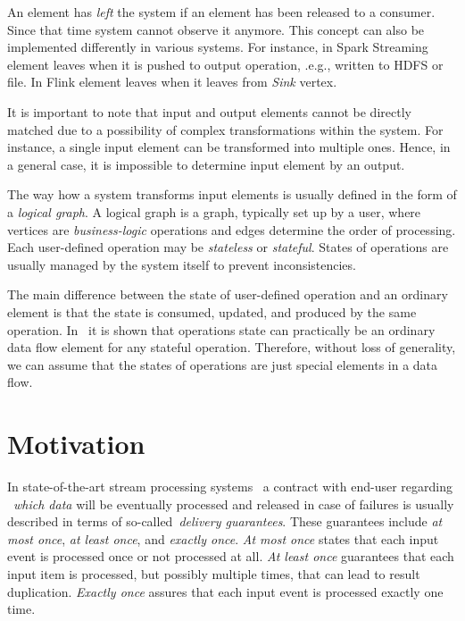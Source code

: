 \documentclass[sigconf]{acmart}
\theoremstyle{definition}
\begin{document}
An element has {\em left} the system if an element has been released to a consumer. Since that time system cannot observe it anymore. This concept can also be implemented differently in various systems. For instance, in Spark Streaming element leaves when it is pushed to output operation, .e.g., written to HDFS or file. In Flink element leaves when it leaves from {\em Sink} vertex.   

It is important to note that input and output elements cannot be directly matched due to a possibility of complex transformations within the system. For instance, a single input element can be transformed into multiple ones. Hence, in a general case, it is impossible to determine input element by an output.

The way how a system transforms input elements is usually defined in the form of a {\em logical graph}. A logical graph is a graph, typically set up by a user, where vertices are {\em business-logic} operations and edges determine the order of processing. Each user-defined operation may be {\em stateless} or {\em stateful}. States of operations are usually managed by the system itself to prevent inconsistencies.

The main difference between the state of user-defined operation and an ordinary element is that the state is consumed, updated, and produced by the same operation. In~\cite{we2018adbis} it is shown that operations state can practically be an ordinary data flow element for any stateful operation. Therefore, without loss of generality, we can assume that the states of operations are just special elements in a data flow.

\section {Motivation}

In state-of-the-art stream processing systems~\cite{carbone2015apache, apache:storm, Zaharia:2016:ASU:3013530.2934664} a contract with end-user regarding ~{\em which data} will be eventually processed and released in case of failures is usually described in terms of so-called~{\em delivery guarantees}. These guarantees include {\em at most once}, {\em at least once}, and {\em exactly once}. {\it At most once} states that each input event is processed once or not processed at all. {\it At least once} guarantees that each input item is processed, but possibly multiple times, that can lead to result duplication. {\it Exactly once} assures that each input event is processed exactly one time.
\end{document}

